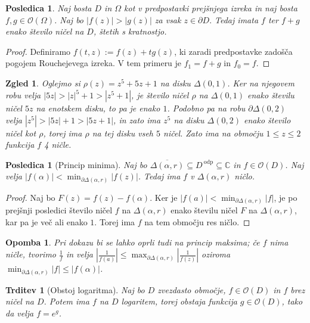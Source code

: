 \documentclass[10pt, a4paper]{article}
\newtheorem{posledica}[izr]{Posledica}
\newtheorem{trditev}[izr]{Trditev}
\newtheorem*{opomba}{Opomba}
\newtheorem{zgled}{Zgled}[section]
\newenvironment{noticeC}{%
  \tcolorbox[%
  notitle,
  empty,
  enhanced,  %
  breakable,
  coltext=black, 
  fontupper=\rmfamily,
  parbox=false,
  noparskip,
  sharp corners,
  boxrule=-1pt,  %
  frame hidden,
  left=7pt,  %
  right=7pt,
  top=5pt,
  bottom=5pt,
  before skip=2.5ex plus 2pt,
  after skip=2.5ex plus 2pt,
  overlay unbroken and last={%
  },
  ]}
{\endtcolorbox}
\newenvironment{dokaz}%
  {\begin{noticeC}\begin{proof}}%
  {\end{proof}\end{noticeC}}
\newcommand{\C}{\mathbb {C}}
\begin{document}
\begin{posledica}
  Naj bosta $D$ in $\Omega$ kot v predpostavki prejšnjega izreka in naj bosta $f, g \in \mathcal{O}(\Omega)$.
  Naj bo $|f(z)| > |g(z)|$ za vsak $z \in \partial D.$
  Tedaj imata $f$ ter $f + g$ enako število ničel na $D$, štetih s kratnostjo.
\end{posledica}

\begin{dokaz}
  Definiramo $f(t, z) := f(z) + tg(z)$, ki zaradi predpostavke zadošča pogojem 
  Rouchejevega izreka. V tem primeru je $f_1 = f + g$ in $f_0 = f$.
\end{dokaz}

\begin{zgled}
  Oglejmo si $\rho(z)  = z^5 + 5z + 1$ na disku $\Delta(0, 1)$.
  Ker na njegovem robu velja $|5z| > |z|^5 + 1 > |z^5 + 1|$,
  je število ničel $\rho$ na $\Delta(0, 1)$ enako številu ničel $5z$ na enotskem disku,
  to pa je enako $1$. Podobno pa na robu $\partial \Delta(0, 2)$ velja $|z^5| > |5z| + 1 > |5z + 1|$,
  in zato ima $z^5$ na disku $\Delta(0, 2)$ enako število ničel kot $\rho$,
  torej ima $\rho$ na tej disku vseh $5$ ničel. Zato ima na območju $1 \leq z \leq 2$
  funkcija $f$ 4 ničle.
\end{zgled}

\begin{posledica}[Princip minima]
  Naj bo $\overline{\Delta (\alpha, r)} \subseteq D^{\ \text{odp}} \subseteq \C$
  in $f \in \mathcal{O} (D)$. Naj velja $|f(\alpha)| < \min_{\partial \Delta(\alpha, r)} |f(z)|$.
  Tedaj ima $f$ v $\Delta(\alpha, r)$ ničlo.
\end{posledica}

\begin{dokaz}
  Naj bo $F(z) =f(z) - f(\alpha)$. Ker je $|f(a)| < \min_{\partial \Delta (\alpha, r)} |f|$,
  je po prejšnji posledici število ničel $f$ 
  na $\Delta(\alpha, r)$ enako številu ničel $F$ na $\Delta (\alpha, r)$, kar pa je več ali enako $1$. Torej ima $f$ na tem območju res ničlo. 
\end{dokaz}

\begin{opomba}
  Pri dokazu bi se lahko oprli tudi na princip maksima; če $f$ nima ničle, tvorimo 
  $\frac{1}{f}$ in velja $\left| \frac{1}{f(a)} \right| \leq \max_{\partial \Delta (\alpha, r)} \left| \frac{1}{f(z)} \right|$
  oziroma $\min_{\partial \Delta (\alpha, r)} |f| \leq |f(\alpha)|$.
\end{opomba}

\begin{trditev}[Obstoj logaritma]
  Naj bo $D$ zvezdasto območje, $f \in \mathcal{O} (D)$ in $f$ brez ničel na $D$.
  Potem ima $f$ na $D$ logaritem, torej obstaja funkcija $g \in \mathcal{O} (D)$,
  tako da velja $f = e^g$.
\end{trditev}
\end{document}
